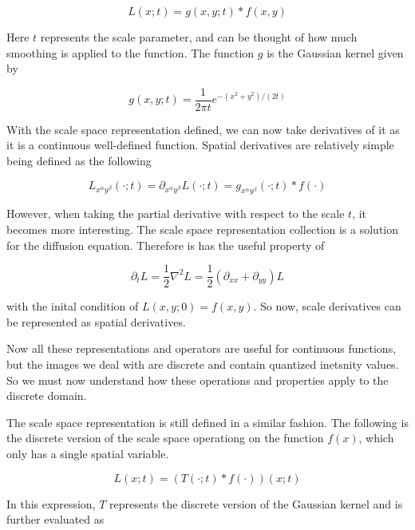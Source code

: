 \documentclass{article}
\begin{document}
    \begin{equation}
        L(x;t) = g(x,y;t) * f(x,y)
    \end{equation}

    Here $t$ represents the scale parameter, and can be thought of how much smoothing is applied to the function. The function $g$ is the Gaussian kernel given by

    \begin{equation}
        g(x,y;t) = \frac{1}{2 \pi t}e^{-(x^2+y^2)/(2t)}
    \end{equation}

    With the scale space representation defined, we can now take derivatives of it as it is a continuous well-defined function. Spatial derivatives are relatively simple being defined as the following

    \begin{equation}
        L_{x^{\alpha}y^{\beta}}(\cdot;t) = \partial_{x^{\alpha}y^{\beta}}L(\cdot;t) = g_{x^{\alpha}y^{\beta}}(\cdot;t) * f(\cdot)
    \end{equation}

    However, when taking the partial derivative with respect to the scale $t$, it becomes more interesting. The scale space representation collection is a solution for the diffusion equation. Therefore is has the useful property of 

    \begin{equation}
        \partial_t L = \frac{1}{2} \nabla^2 L = \frac{1}{2} (\partial_{xx} + \partial_{yy})L
    \end{equation}

    with the inital condition of $L(x,y;0) = f(x,y)$. So now, scale derivatives can be represented as spatial derivatives. 

    Now all these representations and operators are useful for continuous functions, but the images we deal with are discrete and contain quantized inetsnity values. So we must now understand how these operations and properties apply to the discrete domain.

    The scale space representation is still defined in a similar fashion. The following is the discrete version of the scale space operationg on the function $f(x)$, which only has a single spatial variable.

    \begin{equation}
        L(x;t) = (T(\cdot;t) * f(\cdot))(x;t)
    \end{equation}

    In this expression, $T$ represents the discrete version of the Gaussian kernel and is further evaluated as
\end{document}
